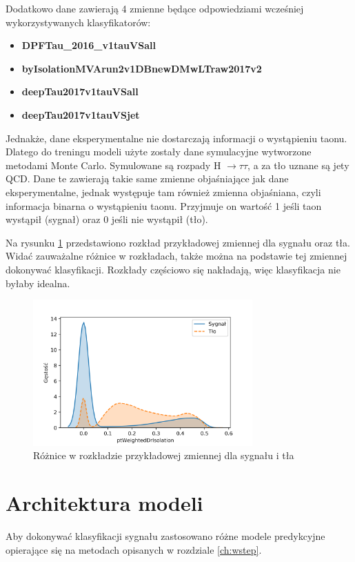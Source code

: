 \documentclass{pracalicmgr}
\begin{document}
	Dodatkowo dane zawierają 4 zmienne będące odpowiedziami wcześniej wykorzystywanych klasyfikatorów:
	\begin{itemize}
	\item \textbf{DPFTau\_2016\_v1tauVSall} %
	\item \textbf{byIsolationMVArun2v1DBnewDMwLTraw2017v2} %
	\item \textbf{deepTau2017v1tauVSall} %
	\item \textbf{deepTau2017v1tauVSjet} %
	\end{itemize}
	
	Jednakże, dane eksperymentalne nie dostarczają informacji o wystąpieniu taonu. Dlatego do treningu modeli użyte zostały dane symulacyjne wytworzone metodami Monte Carlo. Symulowane są rozpady H $\rightarrow\tau\tau$, a za tło uznane są jety QCD. Dane te zawierają takie same zmienne objaśniające jak dane eksperymentalne, jednak występuje tam również zmienna objaśniana, czyli informacja binarna o wystąpieniu taonu. Przyjmuje on wartość 1 jeśli taon wystąpił (sygnał) oraz 0 jeśli nie wystąpił (tło).
	
	Na rysunku \ref{fig:diff} przedstawiono rozkład przykładowej zmiennej dla sygnału oraz tła. Widać zauważalne różnice w rozkładach, także można na podstawie tej zmiennej dokonywać klasyfikacji. Rozkłady częściowo się nakładają, więc klasyfikacja nie byłaby idealna.
	
	
	\begin{figure}[H]
	\centering
	\includegraphics[width=0.75\textwidth]{difference.png}
	\caption{Różnice w rozkładzie przykładowej zmiennej dla sygnału i tła}
	\label{fig:diff}
	\end{figure}
		
    \chapter{Architektura modeli}
	Aby dokonywać klasyfikacji sygnału zastosowano różne modele predykcyjne opierające się na metodach opisanych w rozdziale \ref{ch:wstep}.
\end{document}
